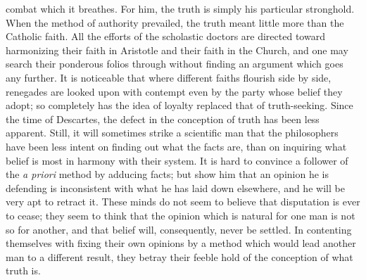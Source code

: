 combat which it breathes. For him, the truth is simply his particular stronghold. When the method of authority prevailed, the truth meant little more than the Catholic faith. All the efforts of the scholastic doctors are directed toward harmonizing their faith in Aristotle and their faith in the Church, and one may search their ponderous folios through without finding an argument which goes any further. It is noticeable that where different faiths flourish side by side, renegades are looked upon with contempt even by the party whose belief they adopt; so completely has the idea of loyalty replaced that of truth-seeking. Since the  time of Descartes, the defect in the conception of truth has been less apparent. Still, it will sometimes strike a scientific man that the philosophers have been less intent on finding out what the facts are, than on inquiring what belief is most in harmony with their system. It is hard to convince a follower of the \emph{a priori} method by adducing facts; but show him that an opinion he is defending is inconsistent with what he has laid down elsewhere, and he will be very apt to retract it. These minds do not seem to believe that disputation is ever to cease; they seem to think that the opinion which is natural for one man is not so for another, and that belief will, consequently, never be settled. In contenting themselves with fixing their own opinions by a method which would lead another man to a different result, they betray their feeble hold of the conception of what truth is. 

